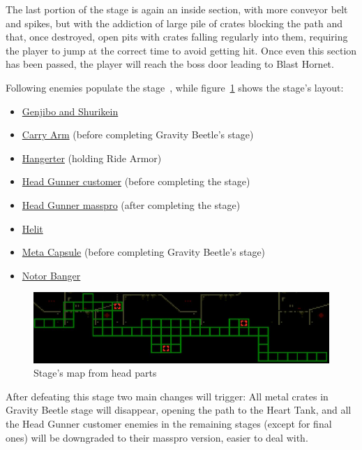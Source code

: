 The last portion of the stage is again an inside section, with more conveyor belt and spikes, but with the addiction of large pile of crates blocking the path and that, once destroyed, open pits with crates falling regularly into them, requiring the player to jump at the correct time to avoid getting hit. Once even this section has been passed, the player will reach the boss door leading to Blast Hornet.

Following enemies populate the stage~\cite{wiki:Weapons_factory}, while figure~\ref{fig:Weapon_factory_map} shows the stage's layout:
\begin{itemize}
\item \hyperlink{miniboss:Shurikein}{Genjibo and Shurikein}
\item \hyperlink{enem:Carry_Arm}{Carry Arm} (before completing Gravity Beetle's stage)
\item \hyperlink{enem:Hangerter}{Hangerter} (holding Ride Armor)
\item \hyperlink{enem:Head_Gunner_customer}{Head Gunner customer} (before completing the stage)
\item \hyperlink{enem:Head_Gunner_masspro}{Head Gunner masspro} (after completing the stage)
\item \hyperlink{enem:Helit}{Helit}
\item \hyperlink{enem:Meta_Capsule}{Meta Capsule} (before completing Gravity Beetle's stage)
\item \hyperlink{enem:Notor_Banger}{Notor Banger}
\end{itemize}

\begin{figure}[htp]
	\centering
	\includegraphics[width=.7\linewidth]{figures/X3/Blast_hornet/map_.png}
	\caption{Stage's map from head parts}
	\label{fig:Weapon_factory_map}
\end{figure}

After defeating this stage two main changes will trigger: All metal crates in Gravity Beetle stage will disappear, opening the path to the Heart Tank, and all the Head Gunner customer enemies in the remaining stages (except for final ones) will be downgraded to their masspro version, easier to deal with.

